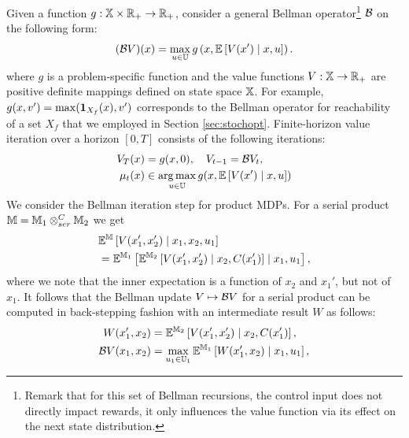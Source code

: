 \documentclass[conference]{IEEEtran}
\begin{document}
Given a function $g: \mathbb{X} \times \mathbb{R}_+ \rightarrow \mathbb{R}_+$, consider a general Bellman operator\footnote{Remark that for this set of Bellman recursions, the control input does not directly impact rewards, it only influences the value function via its effect on the next state distribution.} $\mathcal{B}$ on the following form:
\begin{equation}
(\mathcal{B} V) (x) =  \max_{u \in \mathbb{U}} g \left( x, \mathbb E \left[  V(x') \mid x,u \right] \right).
\end{equation}
where $g$ is a problem-specific function and the value functions $V:\mathbb{X}\rightarrow \mathbb{R}_+$ are positive definite mappings defined on state space $\mathbb{X}$. For example, $g(x, v') = \max(\mathbf{1}_{X_f}(x), v')$ corresponds to the Bellman operator for reachability of a set $X_f$ that we employed in Section \ref{sec:stochopt}. Finite-horizon value iteration over a horizon $[0, T]$ consists of the following iterations:
\begin{equation}
\begin{aligned}
	V_T(x) & = g(x, 0), \quad V_{t-1} = \mathcal{B} V_t,\\
	\mu_t(x) & \in \operatorname*{arg\,max}_{u \in \mathbb{U}} g(x, \mathbb{E}\left[ V(x') \mid x,u \right])
\end{aligned}
\end{equation}
We consider the Bellman iteration step for product MDPs. For a serial product $\mathbb{M} = \mathbb{M}_1 \otimes_{ser}^{C} \mathbb{M}_2$ we get
\begin{equation*}
\begin{aligned}
	&  \mathbb{E}^{\mathbb{M}}\left[ V(x_1', x_2') \mid x_1, x_2, u_1 \right] \\ 
	& = \mathbb{E}^{\mathbb{M}_1} \left[ \mathbb{E}^{\mathbb{M}_2} \left[ V(x_1', x_2') \mid x_2, C(x_1')  \right] \mid x_1, u_1   \right],
\end{aligned}
\end{equation*}
where we note that the inner expectation is a function of $x_2$ and $x_1'$, but not of $x_1$. It follows that the Bellman update $V \mapsto \mathcal{B} V$ for a serial product can be computed in back-stepping fashion with an intermediate result $W$ as follows:
\begin{equation*}
\begin{aligned}
	W(x_1', x_2) & = \mathbb{E}^{\mathbb{M}_2} \left[ V(x_1', x_2') \mid x_2, C(x_1')  \right], \\
	\mathcal{B} V(x_1, x_2) & = \max_{u_1 \in \mathbb{U}_1} \mathbb{E}^{\mathbb{M}_1} \left[ W(x_1', x_2) \mid x_1, u_1   \right], \\
\end{aligned}
\end{equation*}
\end{document}
